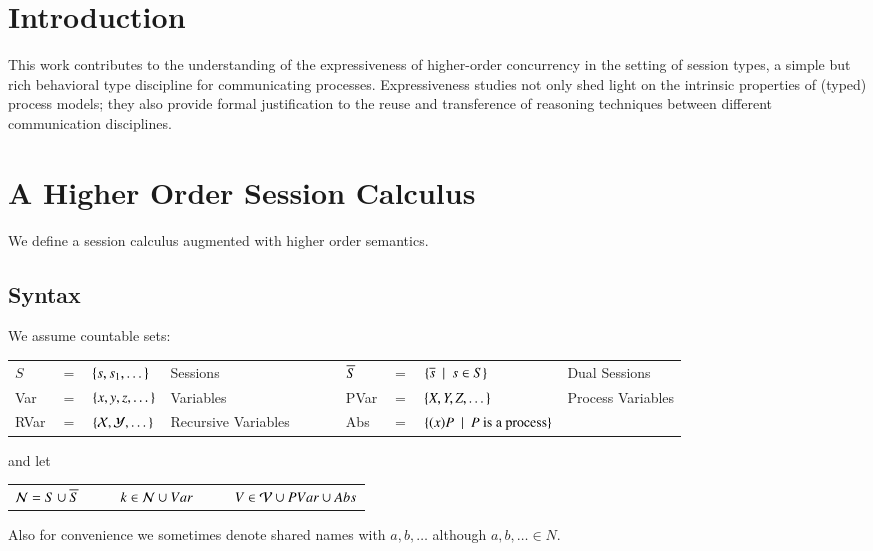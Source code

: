 \section*{Introduction}
This work contributes to the understanding of the expressiveness of higher-order concurrency in the setting of session types, 
a simple but rich behavioral type discipline for communicating processes. 
Expressiveness studies not only shed light on the intrinsic properties of (typed) process models; they
also provide formal justification to the reuse and transference of reasoning techniques between different communication disciplines.

\section{A Higher Order Session Calculus}

We define a session calculus augmented with higher order semantics.

\subsection{Syntax}

We assume countable sets:

\begin{tabular}{lcllclcll}
	$S$ &$=$& $\{s, s_1, \dots\}$ & Sessions
	&$\qquad$&
	$\overline{S}$ &$=$& $\{\overline{s} \ \ |\ \  s \in S\}$ & Dual Sessions
	\\

	Var &$=$& $\{x,y,z, \dots\}$ & Variables
	&$\qquad$&
	PVar &$=$& $\{X, Y, Z, \dots\}$ & Process Variables\\

	RVar &$=$& $\{\mathcal{X}, \mathcal{Y}, \dots\}$ & Recursive Variables
	&$\qquad$&
	Abs &$=$& $\{(x)P \ \ |\ \  P \textrm{ is a process}\}$
\end{tabular}

\noi and let

\begin{tabular}{c}
	$\mathcal{N} = S \cup \overline{S} \quad \qquad k \in \mathcal{N} \cup Var \quad \qquad V \in \mathcal{V} \cup PVar \cup Abs$
\end{tabular}

\noi Also for convenience we sometimes denote shared names with $a, b, \dots$ although $a,b,\dots \in N$.

